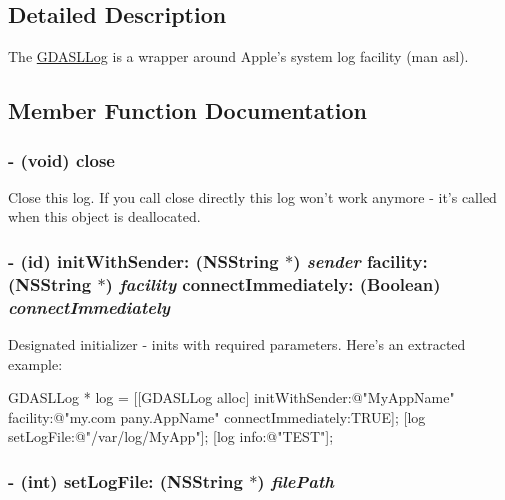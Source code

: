 \subsection{Detailed Description}
The \hyperlink{interface_g_d_a_s_l_log}{GDASLLog} is a wrapper around Apple's system log facility (man asl). 

\subsection{Member Function Documentation}
\hypertarget{interface_g_d_a_s_l_log_ae49db911364a0162197ad1044126c664}{
\subsubsection[{close}]{\setlength{\rightskip}{0pt plus 5cm}-\/ (void) close }}
\label{interface_g_d_a_s_l_log_ae49db911364a0162197ad1044126c664}


Close this log. If you call close directly this log won't work anymore -\/ it's called when this object is deallocated. \hypertarget{interface_g_d_a_s_l_log_ac9553b0e41554a4d75a35f6bd5280956}{
\subsubsection[{initWithSender:facility:connectImmediately:}]{\setlength{\rightskip}{0pt plus 5cm}-\/ (id) initWithSender: ({\bf NSString} $\ast$) {\em sender}\/ facility: ({\bf NSString} $\ast$) {\em facility}\/ connectImmediately: (Boolean) {\em connectImmediately}}}
\label{interface_g_d_a_s_l_log_ac9553b0e41554a4d75a35f6bd5280956}


Designated initializer -\/ inits with required parameters. Here's an extracted example: 
\begin{DoxyCode}
 GDASLLog * log = [[GDASLLog alloc] initWithSender:@"MyAppName" facility:@"my.com
      pany.AppName" connectImmediately:TRUE];
 [log setLogFile:@"/var/log/MyApp"];
 [log info:@"TEST"];
\end{DoxyCode}
 \hypertarget{interface_g_d_a_s_l_log_a60c2903d8fb00b34fafe5c2c1965f811}{
\subsubsection[{setLogFile:}]{\setlength{\rightskip}{0pt plus 5cm}-\/ (int) setLogFile: ({\bf NSString} $\ast$) {\em filePath}}}
\label{interface_g_d_a_s_l_log_a60c2903d8fb00b34fafe5c2c1965f811}


